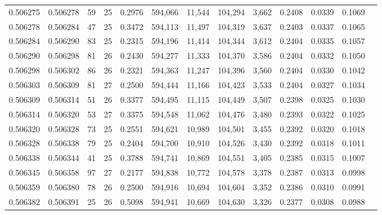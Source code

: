 \begin{tabular}{rrrrrrrrrrrrr}
0.506275 & 0.506278 &  59 &  25 &                                     0.2976 & 594,066 &  11,544 & 104,294 &   3,662 & 0.2408 & 0.0339 & 0.1069 \\
0.506278 & 0.506284 &  47 &  25 &                                     0.3472 & 594,113 &  11,497 & 104,319 &   3,637 & 0.2403 & 0.0337 & 0.1065 \\
0.506284 & 0.506290 &  83 &  25 &                                     0.2315 & 594,196 &  11,414 & 104,344 &   3,612 & 0.2404 & 0.0335 & 0.1057 \\
0.506290 & 0.506298 &  81 &  26 &                                     0.2430 & 594,277 &  11,333 & 104,370 &   3,586 & 0.2404 & 0.0332 & 0.1050 \\
0.506298 & 0.506302 &  86 &  26 &                                     0.2321 & 594,363 &  11,247 & 104,396 &   3,560 & 0.2404 & 0.0330 & 0.1042 \\
0.506303 & 0.506309 &  81 &  27 &                                     0.2500 & 594,444 &  11,166 & 104,423 &   3,533 & 0.2404 & 0.0327 & 0.1034 \\
0.506309 & 0.506314 &  51 &  26 &                                     0.3377 & 594,495 &  11,115 & 104,449 &   3,507 & 0.2398 & 0.0325 & 0.1030 \\
0.506314 & 0.506320 &  53 &  27 &                                     0.3375 & 594,548 &  11,062 & 104,476 &   3,480 & 0.2393 & 0.0322 & 0.1025 \\
0.506320 & 0.506328 &  73 &  25 &                                     0.2551 & 594,621 &  10,989 & 104,501 &   3,455 & 0.2392 & 0.0320 & 0.1018 \\
0.506328 & 0.506338 &  79 &  25 &                                     0.2404 & 594,700 &  10,910 & 104,526 &   3,430 & 0.2392 & 0.0318 & 0.1011 \\
0.506338 & 0.506344 &  41 &  25 &                                     0.3788 & 594,741 &  10,869 & 104,551 &   3,405 & 0.2385 & 0.0315 & 0.1007 \\
0.506345 & 0.506358 &  97 &  27 &                                     0.2177 & 594,838 &  10,772 & 104,578 &   3,378 & 0.2387 & 0.0313 & 0.0998 \\
0.506359 & 0.506380 &  78 &  26 &                                     0.2500 & 594,916 &  10,694 & 104,604 &   3,352 & 0.2386 & 0.0310 & 0.0991 \\
0.506382 & 0.506391 &  25 &  26 &                                     0.5098 & 594,941 &  10,669 & 104,630 &   3,326 & 0.2377 & 0.0308 & 0.0988 \\

\end{tabular}
